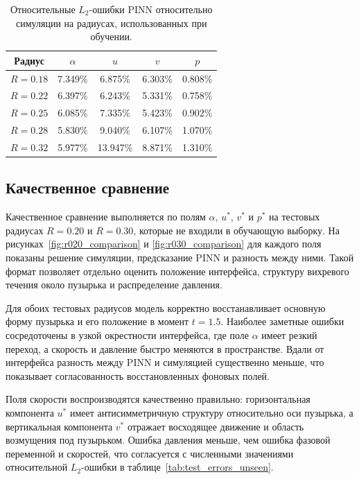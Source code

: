 \documentclass[12pt,a4paper]{article}
\begin{document}
\begin{table}[h]
    \centering
    \begin{tabular}{c|cccc}
        \hline
        Радиус & \(\alpha\) & \(u\) & \(v\) & \(p\) \\
        \hline
        \(R=0.18\) & 7.349\% & 6.875\% & 6.303\% & 0.808\% \\
        \(R=0.22\) & 6.397\% & 6.243\% & 5.331\% & 0.758\% \\
        \(R=0.25\) & 6.085\% & 7.335\% & 5.423\% & 0.902\% \\
        \(R=0.28\) & 5.830\% & 9.040\% & 6.107\% & 1.070\% \\
        \(R=0.32\) & 5.977\% & 13.947\% & 8.871\% & 1.310\% \\
        \hline
    \end{tabular}
    \caption{Относительные \(L_2\)-ошибки PINN относительно симуляции на радиусах, использованных при обучении.}
    \label{tab:test_errors_train}
\end{table}

\FloatBarrier

\subsection{Качественное сравнение}

Качественное сравнение выполняется по полям \(\alpha\), \(u^*\), \(v^*\) и
\(p^*\) на тестовых радиусах \(R=0.20\) и \(R=0.30\), которые не входили в
обучающую выборку. На рисунках~\ref{fig:r020_comparison} и
\ref{fig:r030_comparison} для каждого поля показаны решение симуляции,
предсказание PINN и разность между ними. Такой формат позволяет отдельно
оценить положение интерфейса, структуру вихревого течения около пузырька и
распределение давления.

Для обоих тестовых радиусов модель корректно восстанавливает основную форму
пузырька и его положение в момент \(t=1.5\). Наиболее заметные ошибки
сосредоточены в узкой окрестности интерфейса, где поле \(\alpha\) имеет резкий
переход, а скорость и давление быстро меняются в пространстве. Вдали от
интерфейса разность между PINN и симуляцией существенно меньше, что показывает
согласованность восстановленных фоновых полей.

Поля скорости воспроизводятся качественно правильно: горизонтальная компонента
\(u^*\) имеет антисимметричную структуру относительно оси пузырька, а
вертикальная компонента \(v^*\) отражает восходящее движение и область
возмущения под пузырьком. Ошибка давления меньше, чем ошибка фазовой переменной
и скоростей, что согласуется с численными значениями относительной
\(L_2\)-ошибки в таблице~\ref{tab:test_errors_unseen}.
\end{document}
